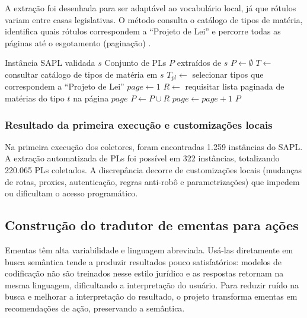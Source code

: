 \documentclass[10pt,a4paper]{article}
\begin{document}
A extração foi desenhada para ser adaptável ao vocabulário local, já que rótulos variam entre casas legislativas. O método consulta o catálogo de tipos de matéria, identifica quais rótulos correspondem a ``Projeto de Lei'' e percorre todas as páginas até o esgotamento (paginação) \cite{drf_pagination}.

\begin{algorithm}[H]
\caption{Extração exaustiva de PLs via API (visão conceitual)}
\label{alg:extracao}
\begin{algorithmic}[1]
\Require Instância SAPL validada $s$
\Ensure Conjunto de PLs $P$ extraídos de $s$
\State $P \gets \emptyset$
\State $T \gets$ consultar catálogo de tipos de matéria em $s$
\State $T_{pl} \gets$ selecionar tipos que correspondem a ``Projeto de Lei''
  \State $page \gets 1$
    \State $R \gets$ requisitar lista paginada de matérias do tipo $t$ na página $page$
    \State $P \gets P \cup R$
    \State $page \gets page + 1$
  \EndWhile
\EndFor
\State \Return $P$
\end{algorithmic}
\end{algorithm}

\subsubsection{Resultado da primeira execução e customizações locais}

Na primeira execução dos coletores, foram encontradas 1.259 instâncias do SAPL. A extração automatizada de PLs foi possível em 322 instâncias, totalizando 220.065 PLs coletados. A discrepância decorre de customizações locais (mudanças de rotas, proxies, autenticação, regras anti-robô e parametrizações) que impedem ou dificultam o acesso programático.

\subsection{Construção do tradutor de ementas para ações}
\label{sec:tradutor}

Ementas têm alta variabilidade e linguagem abreviada. Usá-las diretamente em busca semântica tende a produzir resultados pouco satisfatórios: modelos de codificação não são treinados nesse estilo jurídico e as respostas retornam na mesma linguagem, dificultando a interpretação do usuário. Para reduzir ruído na busca e melhorar a interpretação do resultado, o projeto transforma ementas em recomendações de ação, preservando a semântica.
\end{document}
